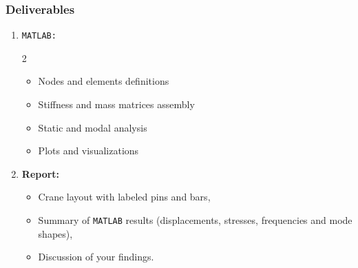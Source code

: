 \documentclass[12pt]{article}
\begin{document}
\subsubsection*{Deliverables}
\begin{enumerate}
  \item \texttt{MATLAB:}
        \begin{multicols}{2}
          \begin{itemize}
            \item Nodes and elements definitions
            \item Stiffness and mass matrices assembly
            \item Static and modal analysis
            \item Plots and visualizations
          \end{itemize}
        \end{multicols}

  \item \textbf{Report:}
        \begin{itemize}
          \item Crane layout with labeled pins and bars,
          \item Summary of \texttt{MATLAB} results (displacements, stresses, frequencies and mode shapes),
          \item Discussion of your findings.
        \end{itemize}
\end{enumerate}
\end{document}
